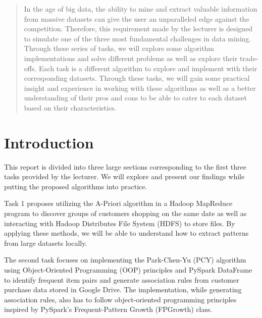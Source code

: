 \documentclass[conference]{IEEEtran}
\begin{document}
    \begin{abstract}
        In the age of big data, the ability to mine and extract valuable information from massive datasets can give the user an unparalleled edge against the competition.
        Therefore, this requirement made by the lecturer is designed to simulate one of the three most fundamental challenges in data mining.
        Through these series of tasks, we will explore some algorithm implementations and solve different problems as well as explore their trade-offs.
        Each task is a different algorithm to explore and implement with their corresponding datasets.
        Through these tasks, we will gain some practical insight and experience in working with these algorithms as well as a better understanding of their pros and cons to be able to cater to each dataset based on their characteristics.
    \end{abstract}


    \section{Introduction}
    \label{sec:introduction}

    This report is divided into three large sections corresponding to the first three tasks provided by the lecturer.
    We will explore and present our findings while putting the proposed algorithms into practice.

    Task 1 proposes utilizing the A-Priori algorithm in a Hadoop MapReduce program to discover groups of customers shopping on the same date as well as interacting with Hadoop Distributes File System (HDFS) to store files.
    By applying these methods, we will be able to understand how to extract patterns from large datasets locally.

    The second task focuses on implementing the Park-Chen-Yu (PCY) algorithm using Object-Oriented Programming (OOP) principles and PySpark DataFrame to identify frequent item pairs and generate association rules from customer purchase data stored in Google Drive.
    The implementation, while generating association rules, also has to follow object-oriented programming principles inspired by PySpark's Frequent-Pattern Growth (FPGrowth) class.
\end{document}
